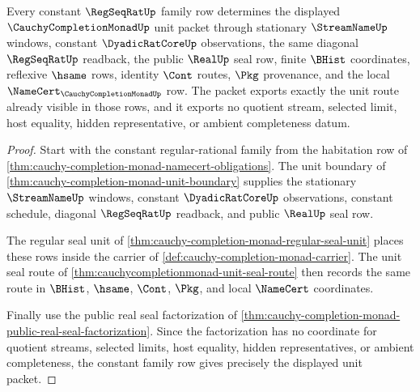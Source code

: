 \begin{theorem}
\label{thm:cauchy-completion-monad-regular-family-unit}
Every constant $\RegSeqRatUp$ family row determines the displayed $\CauchyCompletionMonadUp$ unit packet through stationary $\StreamNameUp$ windows, constant $\DyadicRatCoreUp$ observations, the same diagonal $\RegSeqRatUp$ readback, the public $\RealUp$ seal row, finite $\BHist$ coordinates, reflexive $\hsame$ rows, identity $\Cont$ routes, $\Pkg$ provenance, and the local $\NameCert_{\CauchyCompletionMonadUp}$ row. The packet exports exactly the unit route already visible in those rows, and it exports no quotient stream, selected limit, host equality, hidden representative, or ambient completeness datum.
\end{theorem}
\begin{proof}
Start with the constant regular-rational family from the habitation row of \autoref{thm:cauchy-completion-monad-namecert-obligations}. The unit boundary of \autoref{thm:cauchy-completion-monad-unit-boundary} supplies the stationary $\StreamNameUp$ windows, constant $\DyadicRatCoreUp$ observations, constant schedule, diagonal $\RegSeqRatUp$ readback, and public $\RealUp$ seal row.

The regular seal unit of \autoref{thm:cauchy-completion-monad-regular-seal-unit} places these rows inside the carrier of \autoref{def:cauchy-completion-monad-carrier}. The unit seal route of \autoref{thm:cauchycompletionmonad-unit-seal-route} then records the same route in $\BHist$, $\hsame$, $\Cont$, $\Pkg$, and local $\NameCert$ coordinates.

Finally use the public real seal factorization of \autoref{thm:cauchy-completion-monad-public-real-seal-factorization}. Since the factorization has no coordinate for quotient streams, selected limits, host equality, hidden representatives, or ambient completeness, the constant family row gives precisely the displayed unit packet.
\end{proof}


